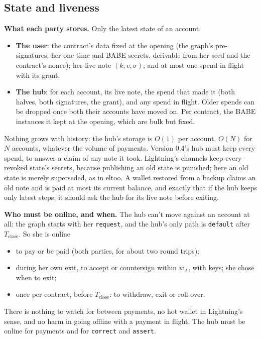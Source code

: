 \documentclass[11pt]{article}
\theoremstyle{plain}
\theoremstyle{definition}
\newcommand{\Tc}{T_{\mathrm{close}}}
\newcommand{\tx}[1]{\texttt{#1}}
\begin{document}
\subsection{State and liveness}\label{sec:state}

\textbf{What each party stores.} Only the latest state of an account.
\begin{itemize}[nosep]
\item \textbf{The user}: the contract's data fixed at the opening (the
  graph's pre-signatures; her one-time and BABE secrets, derivable from
  her seed and the contract's nonce); her live note $(k, v, \sigma)$;
  and at most one spend in flight with its grant.
\item \textbf{The hub}: for each account, its live note, the spend that
  made it (both halves, both signatures, the grant), and any spend in
  flight. Older spends can be dropped once both their accounts have
  moved on. Per contract, the BABE instances it kept at the opening,
  which are bulk but fixed.
\end{itemize}
Nothing grows with history: the hub's storage is $O(1)$ per account,
$O(N)$ for $N$ accounts, whatever the volume of payments. Version 0.4's
hub must keep every spend, to answer a claim of any note it took.
Lightning's channels keep every revoked
state's secrets, because publishing an old state is punished; here an
old state is merely superseded, as in eltoo. A wallet restored from a
backup claims an old note and is paid at most its current balance, and
exactly that if the hub keeps only latest steps; it should ask the hub
for its live note before exiting.

\textbf{Who must be online, and when.} The hub can't move against an
account at all: the graph starts with her \tx{request}, and the hub's
only path is \tx{default} after $\Tc$. So she is online
\begin{itemize}[nosep]
\item to pay or be paid (both parties, for about two round trips);
\item during her own exit, to accept or countersign within $w_A$, with
  keys; she chose when to exit;
\item once per contract, before $\Tc$: to withdraw, exit or roll over.
\end{itemize}
There is nothing to watch for between payments, no hot wallet in
Lightning's sense, and no harm in going offline with a payment in flight.
The hub must be online for payments and for \tx{correct} and
\tx{assert}.
\end{document}
